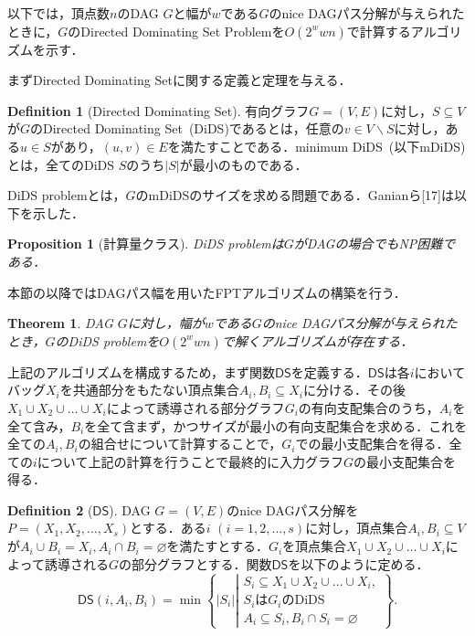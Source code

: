 \documentclass[master]{kuisthesis}		%
\theoremstyle{plain}
\newtheorem{theorem}{Theorem}
\newtheorem{proposition}{Proposition}
\theoremstyle{definition}
\newtheorem{definition*}{Definition}
\begin{document}
以下では，頂点数$n$のDAG $G$と幅が$w$である$G$のnice DAGパス分解が与えられたときに，$G$のDirected Dominating Set Problemを$O(2^wwn)$で計算するアルゴリズムを示す．


まずDirected Dominating Setに関する定義と定理を与える．

\begin{definition*}[Directed Dominating Set]
    有向グラフ$G=(V, E)$に対し，$S \subseteq V$が$G$のDirected Dominating Set\ (DiDS)であるとは，任意の$v \in V\backslash S$に対し，ある$u \in S$があり，$(u, v) \in E$を満たすことである．minimum DiDS\ (以下mDiDS)とは，全てのDiDS $S$のうち$|S|$が最小のものである．
\end{definition*}

DiDS problemとは，$G$のmDiDSのサイズを求める問題である．Ganianら[17]は以下を示した．


\begin{proposition}[計算量クラス]
    DiDS problemは$G$がDAGの場合でもNP困難である．
\end{proposition}

本節の以降ではDAGパス幅を用いたFPTアルゴリズムの構築を行う．

\begin{theorem}
    DAG $G$に対し，幅が$w$である$G$のnice DAGパス分解が与えられたとき，$G$のDiDS problemを$O(2^wwn)$で解くアルゴリズムが存在する．
\end{theorem}

上記のアルゴリズムを構成するため，まず関数$\mathsf{DS}$を定義する．$\mathsf{DS}$は各$i$においてバッグ$X_i$を共通部分をもたない頂点集合$A_i, B_i \subseteq X_i$に分ける．その後$X_1 \cup X_2 \cup \dots \cup X_i$によって誘導される部分グラフ$G_i$の有向支配集合のうち，$A_i$を全て含み，$B_i$を全て含まず，かつサイズが最小の有向支配集合を求める．これを全ての$A_i, B_i$の組合せについて計算することで，$G_i$での最小支配集合を得る．全ての$i$について上記の計算を行うことで最終的に入力グラフ$G$の最小支配集合を得る．

\begin{definition*}[$\mathsf{DS}$]
    DAG $G=(V, E)$のnice DAGパス分解を$P=(X_1, X_2, \dots , X_s)$とする．ある$i$ $(i=1, 2, \dots , s)$に対し，頂点集合$A_i, B_i \subseteq V$が$A_i \cup B_i = X_i, A_i \cap B_i = \varnothing$を満たすとする．$G_i$を頂点集合$X_1 \cup X_2 \cup \dots \cup X_i$によって誘導される$G$の部分グラフとする．関数$\mathsf{DS}$を以下のように定める．
    \begin{equation}\label{def_ds}
        \mathsf{DS}(i, A_i, B_i) = \min \left\{ |S_i| \left |
        \begin{array}{l}
            S_i \subseteq X_1 \cup X_2 \cup  \dots \cup X_i, \\
            S_i \text{は} G_i \text{のDiDS} \\
            A_i \subseteq S_i, B_i \cap S_i = \varnothing
        \end{array}
        \right. \right\}.
    \end{equation}
\end{definition*}
\end{document}
